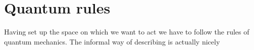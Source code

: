 \section{Quantum rules}
Having set up the space on which we want to act we have to follow the rules of quantum mechanics. The informal way of describing is actually nicely 